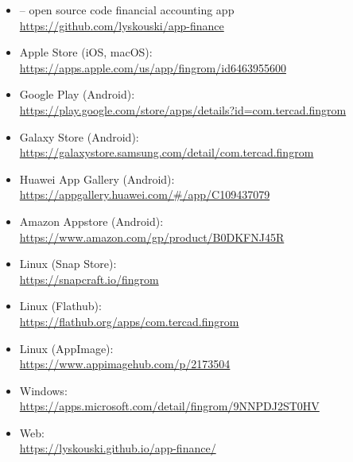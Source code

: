 
\begin{itemize}
\item {} -- open source code financial accounting app\\
\href{https://github.com/lyskouski/app-finance}{https://github.com/lyskouski/app-finance}

\item Apple Store (iOS, macOS):\\
\href{https://apps.apple.com/us/app/fingrom/id6463955600}{https://apps.apple.com/us/app/fingrom/id6463955600}

\item Google Play (Android):\\
\href{https://play.google.com/store/apps/details?id=com.tercad.fingrom}{https://play.google.com/store/apps/details?id=com.tercad.fingrom}

\item Galaxy Store (Android):\\
\href{https://galaxystore.samsung.com/detail/com.tercad.fingrom}{https://galaxystore.samsung.com/detail/com.tercad.fingrom}

\item Huawei App Gallery (Android):\\
\href{https://appgallery.huawei.com/\#/app/C109437079}{https://appgallery.huawei.com/\#/app/C109437079}

\item Amazon Appstore (Android):\\
\href{https://www.amazon.com/gp/product/B0DKFNJ45R}{https://www.amazon.com/gp/product/B0DKFNJ45R}

\item Linux (Snap Store):\\
\href{https://snapcraft.io/fingrom}{https://snapcraft.io/fingrom}

\item Linux (Flathub):\\
\href{https://flathub.org/apps/com.tercad.fingrom}{https://flathub.org/apps/com.tercad.fingrom}

\item Linux (AppImage):\\
\href{https://www.appimagehub.com/p/2173504}{https://www.appimagehub.com/p/2173504}

\item Windows:\\
\href{https://apps.microsoft.com/detail/fingrom/9NNPDJ2ST0HV}{https://apps.microsoft.com/detail/fingrom/9NNPDJ2ST0HV}

\item Web:\\
\href{https://lyskouski.github.io/app-finance/}{https://lyskouski.github.io/app-finance/}

\end{itemize}
